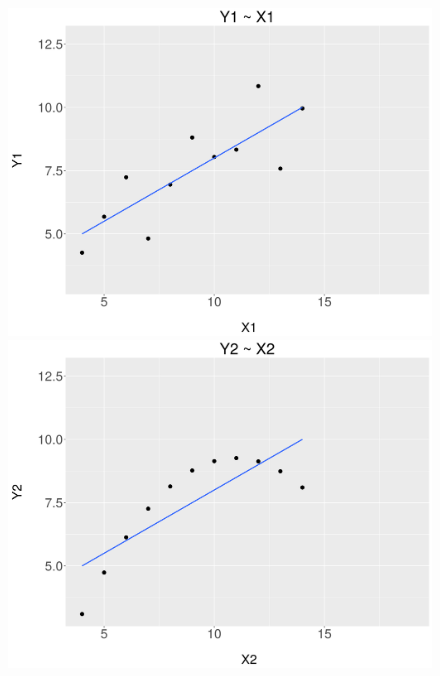 \documentclass[]{article}
\begin{document}
\begin{figure}[!ht] 
  \begin{minipage}[b]{0.5\linewidth}
    \centering
    \includegraphics[width=\linewidth]{q3-1.png} 
    \vspace{2ex}
  \end{minipage}%
  \begin{minipage}[b]{0.5\linewidth}
    \centering
    \includegraphics[width=\linewidth]{q3-2.png} 
    \vspace{2ex}
  \end{minipage} 
  \begin{minipage}[b]{0.5\linewidth}

\end{minipage}
\end{figure}
\end{document}
